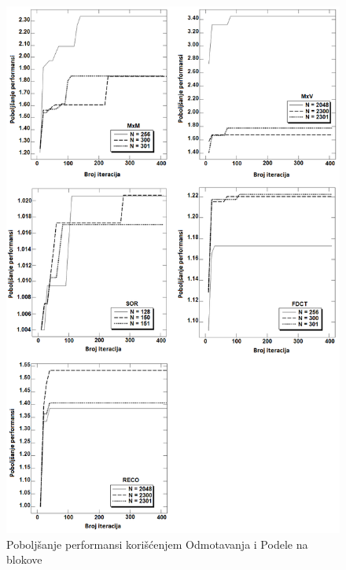\documentclass[a4paper]{article}
\begin{document}
\begin{figure}[p]
\begin{center}
\includegraphics[width=\textwidth]{performanse1}
\end{center}
\caption{Poboljšanje performansi korišćenjem Odmotavanja i Podele na blokove}
\label{fig:slika2}
\end{figure}
\end{document}
